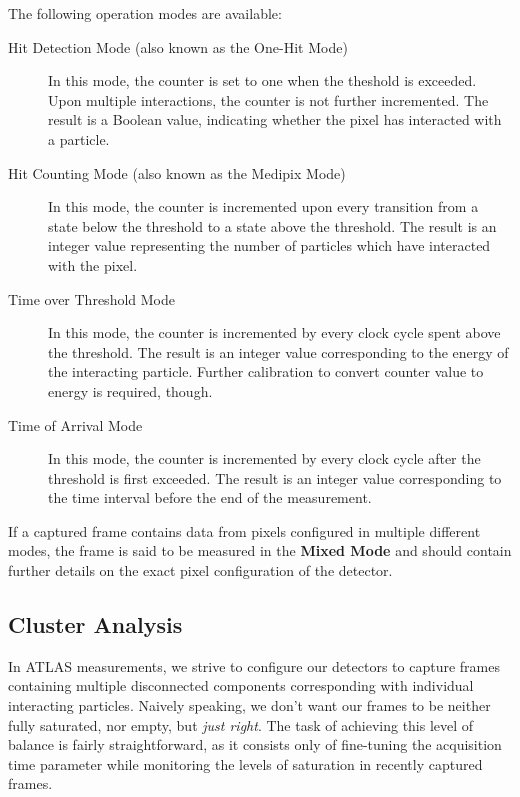 The following operation modes are available:

\begin{description}
	\item[Hit Detection Mode (also known as the One-Hit Mode)]
	In this mode, the counter is set to one when the theshold is exceeded. Upon multiple interactions, the counter is not further incremented. The result is a Boolean value, indicating whether the pixel has interacted with a particle.

	\item[Hit Counting Mode (also known as the Medipix Mode)]
	In this mode, the counter is incremented upon every transition from a state below the threshold to a state above the threshold. The result is an integer value representing the number of particles which have interacted with the pixel.

	\item[Time over Threshold Mode]
	In this mode, the counter is incremented by every clock cycle spent above the threshold. The result is an integer value corresponding to the energy of the interacting particle. Further calibration to convert counter value to energy is required, though.

	\item[Time of Arrival Mode]
	In this mode, the counter is incremented by every clock cycle after the threshold is first exceeded. The result is an integer value corresponding to the time interval before the end of the measurement.
\end{description}

If a captured frame contains data from pixels configured in multiple different modes, the frame is said to be measured in the \textbf{Mixed Mode} and should contain further details on the exact pixel configuration of the detector.


\subsection{Cluster Analysis}
In ATLAS measurements, we strive to configure our detectors to capture frames containing multiple disconnected components corresponding with individual interacting particles. Naively speaking, we don't want our frames to be neither fully saturated, nor empty, but \textit{just right}. The task of achieving this level of balance is fairly straightforward, as it consists only of fine-tuning the acquisition time parameter while monitoring the levels of saturation in recently captured frames.

